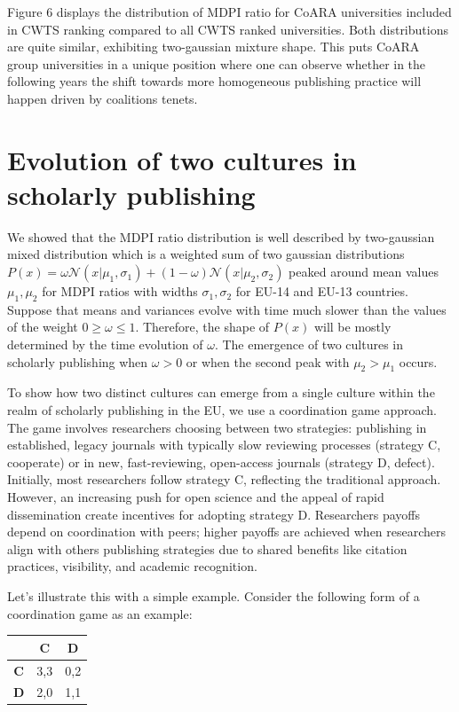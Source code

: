\documentclass[amsfonts, amssymb, prl, superscriptaddress, notitlepage, twocolumn, nofootinbib]{revtex4-2}
\begin{document}
Figure 6 displays the distribution of MDPI ratio for CoARA universities included in CWTS ranking compared to all CWTS ranked universities. Both distributions are quite similar, exhibiting two-gaussian mixture shape. This puts CoARA group universities in a unique position where one can observe whether in the following years the shift towards more homogeneous publishing practice will happen driven by coalitions tenets.   

\section{Evolution of two cultures in scholarly publishing }
We showed that the MDPI ratio distribution is well described by two-gaussian mixed distribution which is a weighted sum of two gaussian distributions $P(x) = \omega\mathcal{N}(x|\mu_1, \sigma_1) + (1-\omega)\mathcal{N}(x|\mu_2, \sigma_2)$ peaked around mean values $\mu_1, \mu_2$ for MDPI ratios with widths $\sigma_1, \sigma_2$ for EU-14 and EU-13 countries. Suppose that means and variances evolve with time much slower than the values of the weight $0\ge\omega\le 1$.  Therefore, the shape of $P(x)$ will be mostly determined by the time evolution of $\omega$. The emergence of two cultures in scholarly publishing when $\omega > 0$ or when the second peak with $\mu_2 >\mu_1$ occurs.  

To show how two distinct cultures can emerge from a single culture within the realm of scholarly publishing in the EU, we use a coordination game approach. The game involves researchers choosing between two strategies: publishing in established, legacy journals with typically slow reviewing processes (strategy C, cooperate) or in new, fast-reviewing, open-access journals (strategy D, defect). Initially, most researchers follow strategy C, reflecting the traditional approach. However, an increasing push for open science and the appeal of rapid dissemination create incentives for adopting strategy D. Researchers payoffs depend on coordination with peers; higher payoffs are achieved when researchers align with others publishing strategies due to shared benefits like citation practices, visibility, and academic recognition.  

 Let's illustrate this with a simple example. Consider the following form of a coordination game as an example: 
 \begin{table}[H]
\centering
\begin{tabular}{c|cc}
    & \textbf{C} & \textbf{D} \\ \hline
    \textbf{C} & 3,3 & 0,2 \\ 
    \textbf{D} & 2,0 & 1,1 \\ 
\end{tabular}
\end{table}
\end{document}
